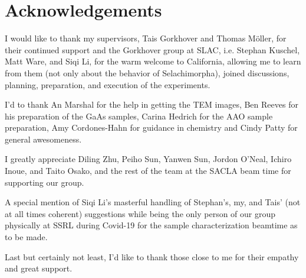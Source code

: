 \begingroup
\let\cleardoublepage\relax
\let\clearpage\relax
\chapter*{Acknowledgements}
\endgroup
\onehalfspacing
I would like to thank my supervisors, Tais Gorkhover and Thomas Möller, for their continued support and the Gorkhover group at SLAC, i.e. Stephan Kuschel, Matt Ware, and Siqi Li, for the warm welcome to California, allowing me to learn from them (not only about the behavior of Selachimorpha), joined discussions, planning, preparation, and execution of the experiments.

I'd to thank An Marshal for the help in getting the TEM images, Ben Reeves for his preparation of the GaAs samples, Carina Hedrich for the AAO sample preparation, 
Amy Cordones-Hahn for guidance in chemistry and Cindy Patty for general awesomeness.

I greatly appreciate Diling Zhu, Peiho Sun, Yanwen Sun, Jordon O'Neal, Ichiro Inoue, and Taito Osako, and the rest of the team at the SACLA beam time for supporting our group. 

A special mention of Siqi Li's masterful handling of Stephan's, my, and Tais' (not at all times coherent) suggestions while being the only person of our group physically at SSRL during Covid-19  for the sample characterization beamtime as to be made.

Last but certainly not least, I'd like to thank those close to me for their empathy and great support.
